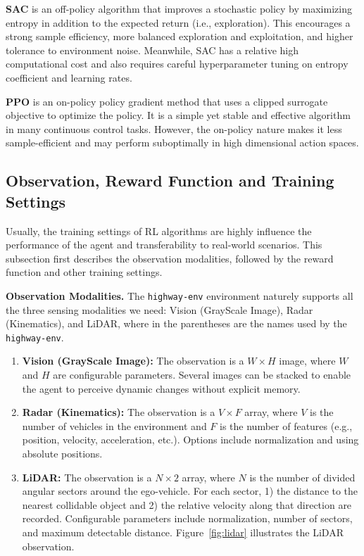 \documentclass{article}
\begin{document}
\textbf{SAC} is an off-policy algorithm that improves a stochastic policy by maximizing entropy in addition to the expected return (i.e., exploration). This encourages a strong sample efficiency, more balanced exploration and exploitation, and higher tolerance to environment noise. Meanwhile, SAC has a relative high computational cost and also requires careful hyperparameter tuning on entropy coefficient and learning rates.

\textbf{PPO} is an on-policy policy gradient method that uses a clipped surrogate objective to optimize the policy. It is a simple yet stable and effective algorithm in many continuous control tasks. However, the on-policy nature makes it less sample-efficient and may perform suboptimally in high dimensional action spaces.

\subsection{Observation, Reward Function and Training Settings}

Usually, the training settings of RL algorithms are highly influence the performance of the agent and transferability to real-world scenarios. This subsection first describes the observation modalities, followed by the reward function and other training settings.

\textbf{Observation Modalities.} The \texttt{highway-env} environment naturely supports all the three sensing modalities we need: Vision (GrayScale Image), Radar (Kinematics), and LiDAR, where in the parentheses are the names used by the \texttt{highway-env}.

\begin{enumerate}
  \item \textbf{Vision (GrayScale Image):} The observation is a $W \times H$ image, where $W$ and $H$ are configurable parameters. Several images can be stacked to enable the agent to perceive dynamic changes without explicit memory.
  \item \textbf{Radar (Kinematics):} The observation is a $V \times F$ array, where $V$ is the number of vehicles in the environment and $F$ is the number of features (e.g., position, velocity, acceleration, etc.). Options include normalization and using absolute positions.
  \item \textbf{LiDAR:} The observation is a $N \times 2$ array, where $N$ is the number of divided angular sectors around the ego-vehicle. For each sector, 1) the distance to the nearest collidable object and 2) the relative velocity along that direction are recorded. Configurable parameters include normalization, number of sectors, and maximum detectable distance. Figure~\ref{fig:lidar} illustrates the LiDAR observation.
\end{enumerate}
\end{document}
